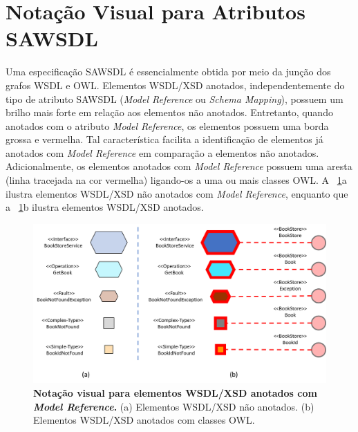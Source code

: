 \section{Notação Visual para Atributos SAWSDL}\label{3-notacao-visual-sawsdl}

Uma especificação SAWSDL é essencialmente obtida por meio da junção dos grafos WSDL e OWL. Elementos WSDL/XSD anotados, independentemente do tipo de atributo SAWSDL (\textit{Model Reference} ou \textit{Schema Mapping}), possuem um brilho mais forte em relação aos elementos não anotados. Entretanto, quando anotados com o atributo \textit{Model Reference}, os elementos possuem uma borda grossa e vermelha. Tal característica facilita a identificação de elementos já anotados com \textit{Model Reference} em comparação a elementos não anotados. Adicionalmente, os elementos anotados com \textit{Model Reference} possuem uma aresta (linha tracejada na cor vermelha) ligando-os a uma ou mais classes OWL. A \figurename~\ref{fig:grafo-wsdl-nao-anotado-e-anotado}a ilustra elementos WSDL/XSD não anotados com \textit{Model Reference}, enquanto que a \figurename~\ref{fig:grafo-wsdl-nao-anotado-e-anotado}b ilustra elementos WSDL/XSD anotados.

\begin{figure}[h]
    \includegraphics[scale=0.4]{3-notacao-visual-sawsdl/imagens/grafo-wsdl-nao-anotado-e-anotado.png}
    \centering
    \caption[Notação visual para elementos WSDL/XSD anotados com \textit{Model Reference}]{\textbf{Notação visual para elementos WSDL/XSD anotados com \textit{Model Reference}.} (a) Elementos WSDL/XSD não anotados. (b) Elementos WSDL/XSD anotados com classes OWL.}
    \label{fig:grafo-wsdl-nao-anotado-e-anotado}
\end{figure}

